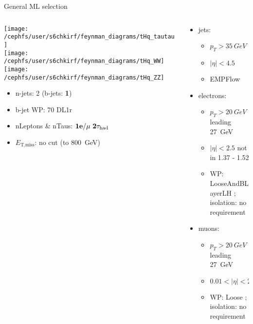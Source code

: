 \begin{frame}{General ML selection}
\begin{columns}
\begin{column}{0.5\textwidth}
\centering \texttt{[image: /cephfs/user/s6chkirf/feynman\_diagrams/tHq\_tautau]}\\
\texttt{[image: /cephfs/user/s6chkirf/feynman\_diagrams/tHq\_WW]}
\texttt{[image: /cephfs/user/s6chkirf/feynman\_diagrams/tHq\_ZZ]}
\begin{itemize}
\item n-jets: 2 (b-jets: \textbf{1})
\item b-jet WP: 70 DL1r
\item nLeptons \& nTaus: $\bf{1e / \mu~2\tau_{\text{had}}} $
\item $E_{\text{T,miss}}$: no cut (to \SI{800}{GeV})
\end{itemize}
\end{column}
\begin{column}{0.7\textwidth}
\vspace*{-0.05\textwidth}
\begin{itemize}
\footnotesize
\item jets:
\vspace*{-0.02\textwidth}
\begin{itemize}
\footnotesize
\item $p_T>\SI{35}{GeV}$
\item $|\eta|<4.5$
\item EMPFlow
\end{itemize}
\item electrons:
\vspace*{-0.02\textwidth}
\begin{itemize}
\footnotesize
\item $p_T>\SI{20}{GeV}$ leading \SI{27}{GeV}
\item $|\eta|<2.5$ not in 1.37 - 1.52
\item WP: LooseAndBLayerLH ; \\isolation: no requirement
\end{itemize}
\item muons:
\vspace*{-0.02\textwidth}
\begin{itemize}
\footnotesize
\item $p_T>\SI{20}{GeV}$ leading \SI{27}{GeV}
\item $0.01<|\eta|<2.5$
\item WP: Loose ; isolation: no requirement

\end{itemize}
\end{itemize}
\end{column}
\end{columns}
\end{frame}
